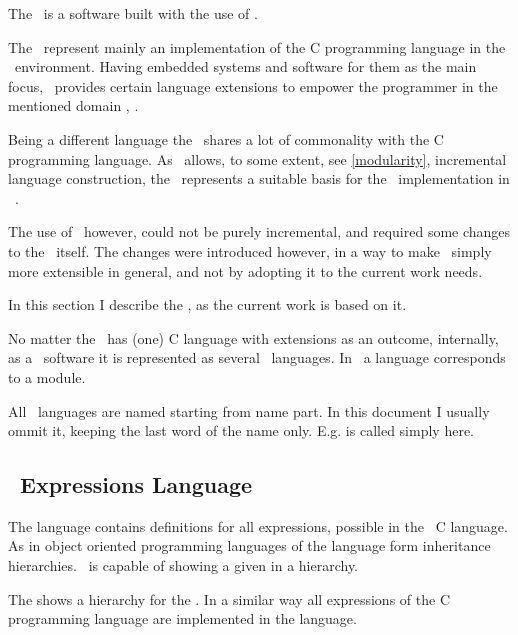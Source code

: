 
The \mbdp\ is a software built with the use of \jbmps.

The \mbdrp\ represent mainly an implementation of the C programming language in the \jbmps\ environment. Having embedded systems
and software for them as the main focus, \mbdr\ provides certain language extensions to empower the programmer in the mentioned domain \cite{mbeddr-wave}, 
\cite{Voelter:MoDELS:2010}. 

Being a different language the \cpppl\ shares a lot of commonality with the C programming language. 
As \jbmps\ allows, to some extent, see \ref{modularity}, incremental language construction, the \mbdrp\ represents 
a suitable basis for the \cpppl\ implementation in \jbmps\ . 

The use of \mbdr\, however, could not be purely incremental, and required some changes to the \mbdr\ itself. 
The changes were introduced however, in a way to make \mbdr\ simply more extensible in general, and not by
adopting it to the current work needs.

In this section I describe the \mbdp, as the current work is based on it.

No matter the \mbdp\ has  (one) C language with extensions as an outcome, internally, as a \jbmps\ software
it is represented as several \jbmps\ languages. In \jbmps\ a language corresponds to a module.

All \mbdr\ languages are named starting from  name part. In this document I usually ommit it,
keeping the last word of the name only. E.g.  is called simply  here.

\subsection{\mbdr\ Expressions Language}

The  language contains definitions for all expressions, possible in the \mbdr\ C language.
As in object oriented programming languages  of the  language form inheritance hierarchies. 
\jbmps\ is capable of showing a given  in a hierarchy. 


The  shows a hierarchy for the  . In a similar way all expressions of the 
C programming language are implemented in the  language.

